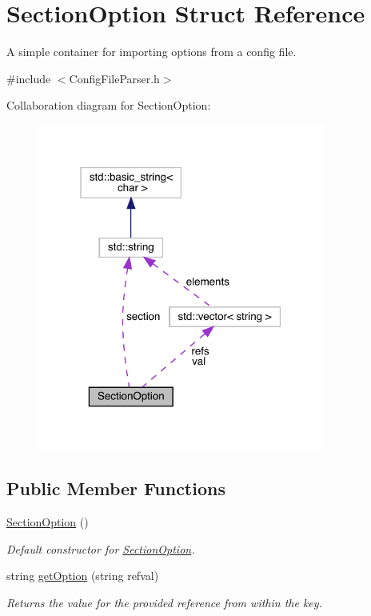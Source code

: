 \hypertarget{struct_section_option}{}\section{Section\+Option Struct Reference}
\label{struct_section_option}


A simple container for importing options from a config file.  




{\ttfamily \#include $<$Config\+File\+Parser.\+h$>$}



Collaboration diagram for Section\+Option\+:\nopagebreak
\begin{figure}[H]
\begin{center}
\leavevmode
\includegraphics[width=267pt]{struct_section_option__coll__graph}
\end{center}
\end{figure}
\subsection*{Public Member Functions}
\begin{DoxyCompactItemize}
\item 
\hyperlink{struct_section_option_a0a6a33e41311ea0eef34b76379421362}{Section\+Option} ()\hypertarget{struct_section_option_a0a6a33e41311ea0eef34b76379421362}{}\label{struct_section_option_a0a6a33e41311ea0eef34b76379421362}

\begin{DoxyCompactList}\small\item\em Default constructor for \hyperlink{struct_section_option}{Section\+Option}. \end{DoxyCompactList}\item 
string \hyperlink{struct_section_option_a78d55aa842ba2056764236246492734f}{get\+Option} (string refval)
\begin{DoxyCompactList}\small\item\em Returns the value for the provided reference from within the key. \end{DoxyCompactList}\end{DoxyCompactItemize}
